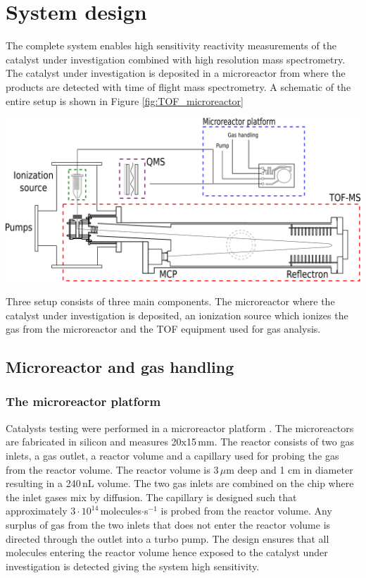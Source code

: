 \documentclass[11pt]{article}
\begin{document}
\section{System design}
The complete system enables high sensitivity reactivity measurements of the catalyst under investigation combined with high resolution mass spectrometry. The catalyst under investigation is deposited in a microreactor from where the products are detected with time of flight mass spectrometry. A schematic of the entire setup is shown in Figure \ref{fig:TOF_microreactor}
\begin{center}
	\includegraphics[scale=0.60]{TOF_microreactor.png}
	\label{fig:TOF_microreactor}
\end{center}
Three setup consists of three main components. The microreactor where the catalyst under investigation is deposited, an ionization source which ionizes the gas from the microreactor and the TOF equipment used for gas analysis. 

\subsection{Microreactor and gas handling}

\subsubsection{The microreactor platform}
Catalysts testing were performed in a microreactor platform \cite{Henriksen2009}. The microreactors are fabricated in silicon and measures 20x15\,mm. The reactor consists of two gas inlets, a gas outlet, a reactor volume and a capillary used for probing the gas from the reactor volume. The reactor volume is 3\,$\mu$m deep and 1 cm in diameter resulting in a 240\,nL volume. The two gas inlets are combined on the chip where the inlet gases mix by diffusion. The capillary is designed such that approximately $3\cdot10^{14}$\,molecules$\cdot$s$^{-1}$ is probed from the reactor volume. Any surplus of gas from the two inlets that does not enter the reactor volume is directed through the outlet into a turbo pump. The design ensures that all molecules entering the reactor volume hence exposed to the catalyst under investigation is detected giving the system high sensitivity.
\end{document}

